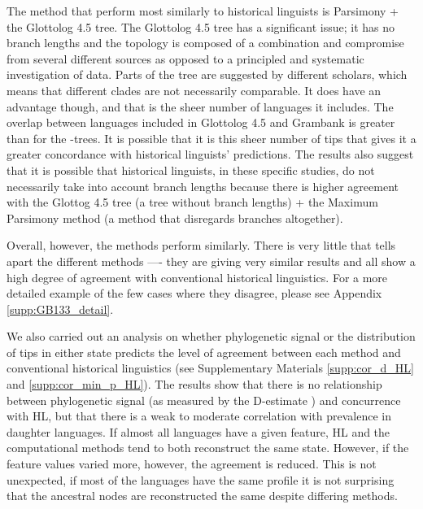 \documentclass[12pt,letterpaper]{article}
\begin{document}
The method that perform most similarly to historical linguists is Parsimony + the Glottolog 4.5 tree. The Glottolog 4.5 tree has a significant issue; it has no branch lengths and the topology is composed of a combination and compromise from several different sources as opposed to a principled and systematic investigation of  data. Parts of the tree are suggested by different scholars, which means that different clades are not necessarily comparable. It does have an advantage though, and that is the sheer number of languages it includes. The overlap between languages included in Glottolog 4.5 and Grambank is greater than for the \citet{grayetal_2009}-trees. It is possible that it is this sheer number of tips that gives it a greater concordance with historical linguists' predictions. The results also suggest that it is possible that historical linguists, in these specific studies, do not necessarily take into account branch lengths because there is higher agreement with the Glottog 4.5 tree (a tree without branch lengths) + the Maximum Parsimony method (a method that disregards branches altogether).

Overall, however, the methods perform similarly. There is very little that tells apart the different methods ---- they are giving very similar results and all show a high degree of agreement with conventional historical linguistics. For a more detailed example of the few cases where they disagree, please see Appendix \ref{supp:GB133_detail}.

We also carried out an analysis on whether phylogenetic signal \citep{fritz2010selectivity} or the distribution of tips in either state predicts the level of agreement between each method and conventional historical linguistics (see Supplementary Materials \ref{supp:cor_d_HL} and \ref{supp:cor_min_p_HL}). The results show that there is no relationship between phylogenetic signal (as measured by the D-estimate \citep{fritz2010selectivity}) and concurrence with HL, but that there is a weak to moderate correlation with prevalence in daughter languages. If almost all languages have a given feature, HL and the computational methods tend to both reconstruct the same state. However, if the feature values varied more, however, the agreement is reduced. This is not unexpected, if most of the languages have the same profile it is not surprising that the ancestral nodes are reconstructed the same despite differing methods.
\end{document}
